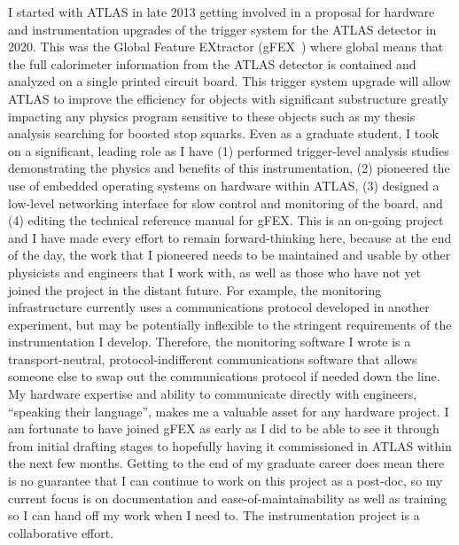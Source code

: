 \documentclass[letterpaper, 10pt]{article}
\begin{document}
I started with ATLAS in late 2013 getting involved in a proposal for hardware and instrumentation upgrades of the trigger system for the ATLAS detector in 2020. This was the Global Feature EXtractor (gFEX~) where global means that the full calorimeter information from the ATLAS detector is contained and analyzed on a single printed circuit board. This trigger system upgrade will allow ATLAS to improve the efficiency for objects with significant substructure greatly impacting any physics program sensitive to these objects such as my thesis analysis searching for boosted stop squarks. Even as a graduate student, I took on a significant, leading role as I have (1) performed trigger-level analysis studies demonstrating the physics and benefits of this instrumentation, (2) pioneered the use of embedded operating systems on hardware within ATLAS, (3) designed a low-level networking interface for slow control and monitoring of the board, and (4) editing the technical reference manual for gFEX. This is an on-going project and I have made every effort to remain forward-thinking here, because at the end of the day, the work that I pioneered needs to be maintained and usable by other physicists and engineers that I work with, as well as those who have not yet joined the project in the distant future. For example, the monitoring infrastructure currently uses a communications protocol developed in another experiment, but may be potentially inflexible to the stringent requirements of the instrumentation I develop. Therefore, the monitoring software I wrote is a transport-neutral, protocol-indifferent communications software that allows someone else to swap out the communications protocol if needed down the line. My hardware expertise and ability to communicate directly with engineers, ``speaking their language'', makes me a valuable asset for any hardware project. I am fortunate to have joined gFEX as early as I did to be able to see it through from initial drafting stages to hopefully having it commissioned in ATLAS within the next few months. Getting to the end of my graduate career does mean there is no guarantee that I can continue to work on this project as a post-doc, so my current focus is on documentation and ease-of-maintainability as well as training so I can hand off my work when I need to. The instrumentation project is a collaborative effort.
\end{document}
